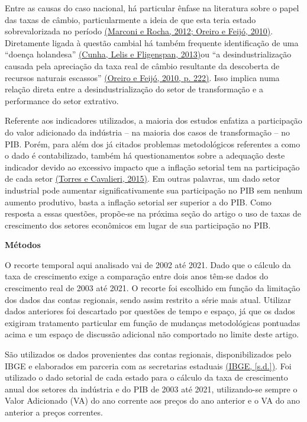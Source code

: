 Entre as causas do caso nacional, há particular ênfase na literatura
sobre o papel das taxas de câmbio, particularmente a ideia de que esta
teria estado sobrevalorizada no período
\href{https://www.zotero.org/google-docs/?SmfxoM}{(Marconi e Rocha,
2012; Oreiro e Feijó, 2010)}. Diretamente ligada à questão cambial há
também frequente identificação de uma ``doença holandesa''
\href{https://www.zotero.org/google-docs/?3ti55W}{(Cunha, Lelis e
Fligenspan, 2013)}ou ``a desindustrialização causada pela apreciação da
taxa real de câmbio resultante da descoberta de recursos naturais
escassos'' \href{https://www.zotero.org/google-docs/?rWMrUB}{(Oreiro e
Feijó, 2010, p. 222)}. Isso implica numa relação direta entre a
desindustrialização do setor de transformação e a performance do setor
extrativo.

Referente aos indicadores utilizados, a maioria dos estudos enfatiza a
participação do valor adicionado da indústria -- na maioria dos casos de
transformação -- no PIB. Porém, para além dos já citados problemas
metodológicos referentes a como o dado é contabilizado, também há
questionamentos sobre a adequação deste indicador devido ao excessivo
impacto que a inflação setorial tem na participação de cada setor
\href{https://www.zotero.org/google-docs/?NYfMT1}{(Torres e Cavalieri,
2015)}. Em outras palavras, um dado setor industrial pode aumentar
significativamente sua participação no PIB sem nenhum aumento produtivo,
basta a inflação setorial ser superior a do PIB. Como resposta a essas
questões, propõe-se na próxima seção do artigo o uso de taxas de
crescimento dos setores econômicos em lugar de sua participação no PIB.

\textbf{Métodos}

O recorte temporal aqui analisado vai de 2002 até 2021. Dado que o
cálculo da taxa de crescimento exige a comparação entre dois anos têm-se
dados do crescimento real de 2003 até 2021. O recorte foi escolhido em
função da limitação dos dados das contas regionais, sendo assim restrito
a série mais atual. Utilizar dados anteriores foi descartado por
questões de tempo e espaço, já que os dados exigiram tratamento
particular em função de mudanças metodológicas pontuadas acima e um
espaço de discussão adicional não comportado no limite deste artigo.

São utilizados os dados provenientes das contas regionais,
disponibilizados pelo IBGE e elaborados em parceria com as secretarias
estaduais \href{https://www.zotero.org/google-docs/?uwDtJh}{(IBGE,
{[}s.d.{]})}. Foi utilizado o dado setorial de cada estado para o
cálculo da taxa de crescimento anual dos setores da indústria e do PIB
de 2003 até 2021, utilizando-se sempre o Valor Adicionado (VA) do ano
corrente aos preços do ano anterior e o VA do ano anterior a preços
correntes.

